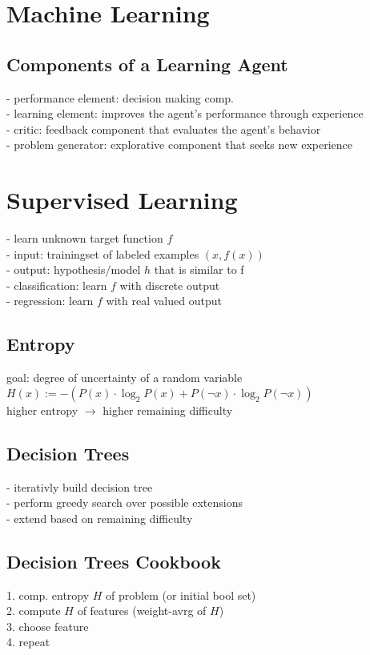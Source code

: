 \section{Machine Learning}
\subsection*{Components of a Learning Agent}
- performance element: decision making comp. \\
- learning element: improves the agent's performance through experience \\
- critic: feedback component that evaluates the agent's behavior \\
- problem generator: explorative component that seeks new experience

\section*{Supervised Learning}
- learn unknown target function $f$ \\
- input: trainingset of labeled examples $(x, f(x))$ \\
- output: hypothesis/model $h$ that is similar to f \\ 
- classification: learn $f$ with discrete output \\
- regression: learn $f$ with real valued output

\subsection*{Entropy}
goal: degree of uncertainty of a random variable \\
$H(x) := -(P(x)\cdot\log_{2} P(x) + P(\lnot x)\cdot\log_{2}P(\lnot x))$ \\
higher entropy $\rightarrow$ higher remaining difficulty

\subsection*{Decision Trees}
- iterativly build decision tree \\
- perform greedy search over possible extensions \\
- extend based on remaining difficulty

\subsection*{Decision Trees Cookbook}
1. comp. entropy $H$ of problem (or initial bool set) \\
2. compute $H$ of features (weight-avrg of $H$) \\
3. choose feature \\
4. repeat

